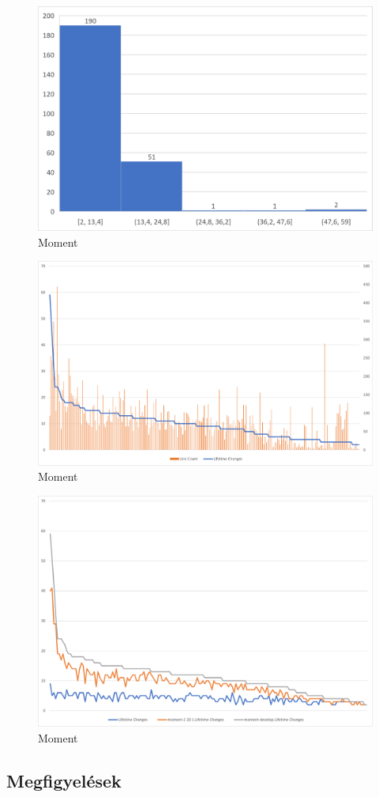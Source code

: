 \begin{figure}[H]
    \centering
    \includegraphics[width=1\textwidth]{images/moment/moment-dev-hist.png}
    \caption{Moment}
    \label{fig:moment-2.10.5-changes}
\end{figure}

\begin{figure}[H]
    \centering
    \includegraphics[width=1\textwidth]{images/moment/moment-dev-lines.png}
    \caption{Moment}
    \label{fig:moment-2.10.5-changes}
\end{figure}

\begin{figure}[H]
    \centering
    \includegraphics[width=1\textwidth]{images/moment/moment-all-changes.png}
    \caption{Moment}
    \label{fig:moment-2.10.5-changes}
\end{figure}

\subsection{Megfigyelések}